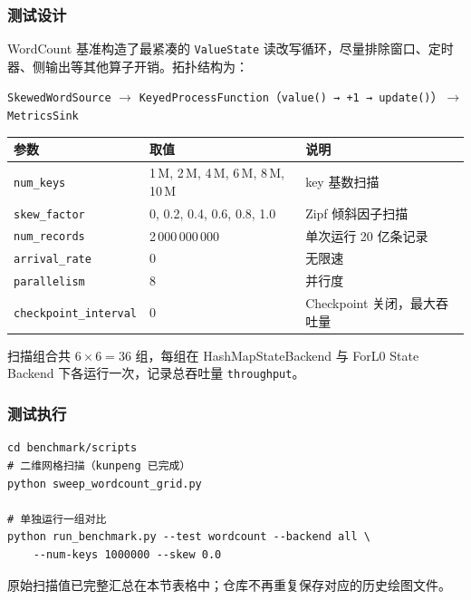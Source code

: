 \documentclass[a4paper,11pt]{article}
\newcommand{\project}{ForL0 State Backend}
\begin{document}
\subsubsection{测试设计}

WordCount 基准构造了最紧凑的 \texttt{ValueState} 读改写循环，尽量排除窗口、定时器、侧输出等其他算子开销。拓扑结构为：

\begin{center}
\small\sffamily
\texttt{SkewedWordSource} $\rightarrow$ \texttt{KeyedProcessFunction}（\texttt{value() → +1 → update()}）$\rightarrow$ \texttt{MetricsSink}
\end{center}

\begin{table}[H]
\centering
\small
\begin{tabularx}{\textwidth}{L{3.4cm} L{3.2cm} X}
\toprule
\textbf{参数} & \textbf{取值} & \textbf{说明} \\
\midrule
\texttt{num\_keys}           & 1\,M, 2\,M, 4\,M, 6\,M, 8\,M, 10\,M & key 基数扫描 \\
\texttt{skew\_factor}        & 0, 0.2, 0.4, 0.6, 0.8, 1.0          & Zipf 倾斜因子扫描 \\
\texttt{num\_records}        & 2\,000\,000\,000 & 单次运行 20 亿条记录 \\
\texttt{arrival\_rate}       & 0 & 无限速 \\
\texttt{parallelism}         & 8 & 并行度 \\
\texttt{checkpoint\_interval}& 0 & Checkpoint 关闭，最大吞吐量 \\
\bottomrule
\end{tabularx}
\end{table}

扫描组合共 $6 \times 6 = 36$ 组，每组在 HashMapStateBackend 与 \project{} 下各运行一次，记录总吞吐量 \texttt{throughput}。

\subsubsection{测试执行}

\begin{lstlisting}[language=shellcmd]
cd benchmark/scripts
# 二维网格扫描（kunpeng 已完成）
python sweep_wordcount_grid.py

# 单独运行一组对比
python run_benchmark.py --test wordcount --backend all \
    --num-keys 1000000 --skew 0.0
\end{lstlisting}

原始扫描值已完整汇总在本节表格中；仓库不再重复保存对应的历史绘图文件。
\end{document}
